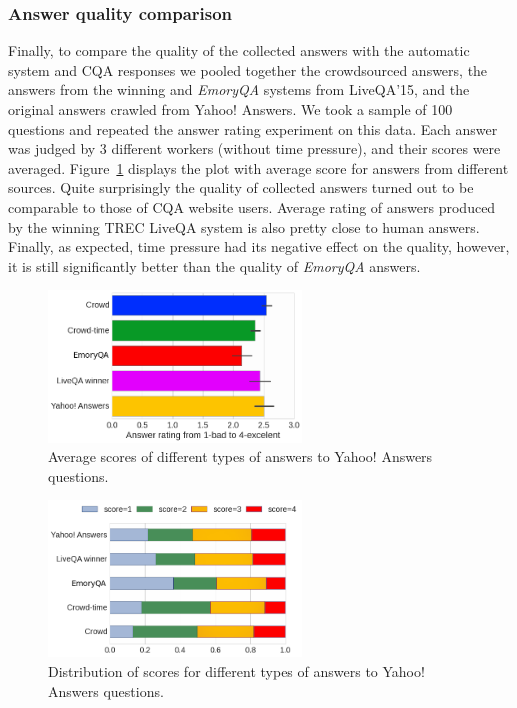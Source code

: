 \subsubsection{Answer quality comparison}
\label{section:non-factoid:crowdsourcing:approach:experiments:comparison}

Finally, to compare the quality of the collected answers with the automatic system and CQA responses we pooled together the crowdsourced answers, the answers from the winning and \textit{EmoryQA} systems from LiveQA'15, and the original answers crawled from Yahoo! Answers.
We took a sample of 100 questions and repeated the answer rating experiment on this data.
Each answer was judged by 3 different workers (without time pressure), and their scores were averaged.
Figure~\ref{figure:non-factoid:crowdsourcing:average_score} displays the plot with average score for answers from different sources.
Quite surprisingly the quality of collected answers turned out to be comparable to those of CQA website users.
Average rating of answers produced by the winning TREC LiveQA system is also pretty close to human answers.
Finally, as expected, time pressure had its negative effect on the quality, however, it is still significantly better than the quality of \textit{EmoryQA} answers.

\begin{figure}
    \centering
    \includegraphics[width=0.6\textwidth]{img/average_score}
    \caption{Average scores of different types of answers to Yahoo! Answers questions.}
    \label{figure:non-factoid:crowdsourcing:average_score}
\end{figure}

\begin{figure}[h]
    \centering
    \includegraphics[width=0.6\textwidth]{img/scores_distribution}
    \caption{Distribution of scores for different types of answers to Yahoo! Answers questions.}
    \label{figure:non-factoid:crowdsourcing:scores_distribution}
\end{figure}


